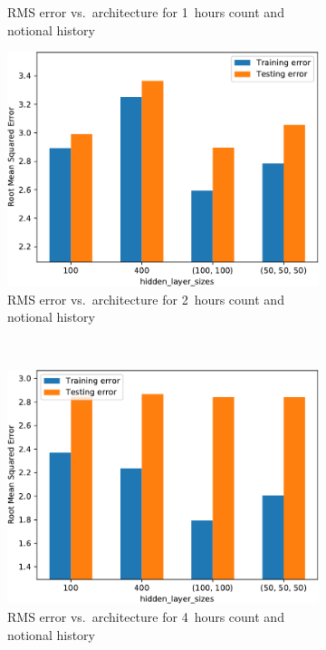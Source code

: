 \begin{figure}[!ht]
\begin{subfigure}[t]{.47\linewidth}
        \caption{RMS error vs.~architecture for 1~hours count and notional history}\label{AppAplotA5}
    \end{subfigure}\hfill%
    \begin{subfigure}[t]{.47\linewidth}\centering
        \includegraphics[width=0.9\linewidth]{./figures/AplotA6.pdf}
        \caption{RMS error vs.~architecture for 2~hours count and notional history}\label{AppAplotA6}
    \end{subfigure}\\[5pt]
    \begin{subfigure}[t]{.47\linewidth}\centering
        \includegraphics[width=0.9\linewidth]{./figures/AplotA7.pdf}
        \caption{RMS error vs.~architecture for 4~hours count and notional history}\label{AppAplotA7}
    \end{subfigure}\hfill%
    \begin{subfigure}[t]{.47\linewidth}\centering

\end{subfigure}
\end{figure}
